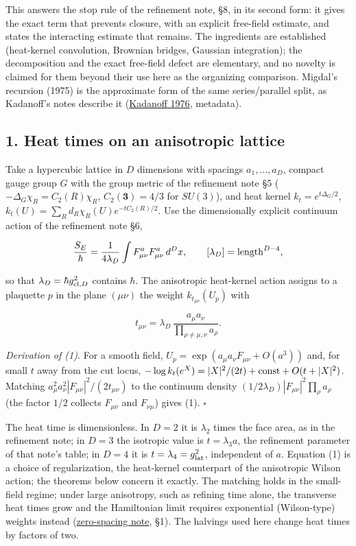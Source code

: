 \documentclass[11pt,a4paper]{article}
\begin{document}
This answers the stop rule of the refinement note, §8, in its second
form: it gives the exact term that prevents closure, with an explicit
free-field estimate, and states the interacting estimate that remains.
The ingredients are established (heat-kernel convolution, Brownian
bridges, Gaussian integration); the decomposition and the exact
free-field defect are elementary, and no novelty is claimed for them
beyond their use here as the organizing comparison. Migdal's recursion
(1975) is the approximate form of the same series/parallel split, as
Kadanoff's notes describe it
(\href{https://doi.org/10.1016/0003-4916(76)90066-X}{Kadanoff 1976},
metadata).

\hypertarget{heat-times-on-an-anisotropic-lattice}{%
\subsection{1. Heat times on an anisotropic
lattice}\label{heat-times-on-an-anisotropic-lattice}}

Take a hypercubic lattice in \(D\) dimensions with spacings
\(a_1,\dots,a_D\), compact gauge group \(G\) with the group metric of
the refinement note §5 (\(-\Delta_G\chi_R=C_2(R)\chi_R\),
\(C_2(\mathbf3)=4/3\) for \(SU(3)\)), and heat kernel
\(k_t=e^{t\Delta_G/2}\), \(k_t(U)=\sum_Rd_R\chi_R(U)e^{-tC_2(R)/2}\).
Use the dimensionally explicit continuum action of the refinement note
§6,

\[\frac{S_E}{\hbar}=\frac1{4\lambda_D}\int F^a_{\mu\nu}F^a_{\mu\nu}\,d^Dx,
\qquad[\lambda_D]={\rm length}^{D-4},\]

so that \(\lambda_D=\hbar g_{{\rm cl},D}^2\) contains \(\hbar\). The
anisotropic heat-kernel action assigns to a plaquette \(p\) in the plane
\((\mu\nu)\) the weight \(k_{t_{\mu\nu}}(U_p)\) with

\[t_{\mu\nu}=\lambda_D\,\frac{a_\mu a_\nu}{\prod_{\rho\ne\mu,\nu}a_\rho}.
\tag{1}\]

\emph{Derivation of (1).} For a smooth field,
\(U_p=\exp(a_\mu a_\nu F_{\mu\nu}+O(a^3))\) and, for small \(t\) away
from the cut locus,
\(-\log k_t(e^X)=|X|^2/(2t)+{\rm const}+O(t+|X|^2)\). Matching
\(a_\mu^2a_\nu^2|F_{\mu\nu}|^2/(2t_{\mu\nu})\) to the continuum density
\((1/2\lambda_D)|F_{\mu\nu}|^2\prod_\rho a_\rho\) (the factor \(1/2\)
collects \(F_{\mu\nu}\) and \(F_{\nu\mu}\)) gives (1). \(\square\)

The heat time is dimensionless. In \(D=2\) it is \(\lambda_2\) times the
face area, as in the refinement note; in \(D=3\) the isotropic value is
\(t=\lambda_3a\), the refinement parameter of that note's table; in
\(D=4\) it is \(t=\lambda_4=g_{\rm lat}^2\), independent of \(a\).
Equation (1) is a choice of regularization, the heat-kernel counterpart
of the anisotropic Wilson action; the theorems below concern it exactly.
The matching holds in the small-field regime; under large anisotropy,
such as refining time alone, the transverse heat times grow and the
Hamiltonian limit requires exponential (Wilson-type) weights instead
(\href{zero-spacing-any-action.md}{zero-spacing note}, §1). The halvings
used here change heat times by factors of two.
\end{document}
